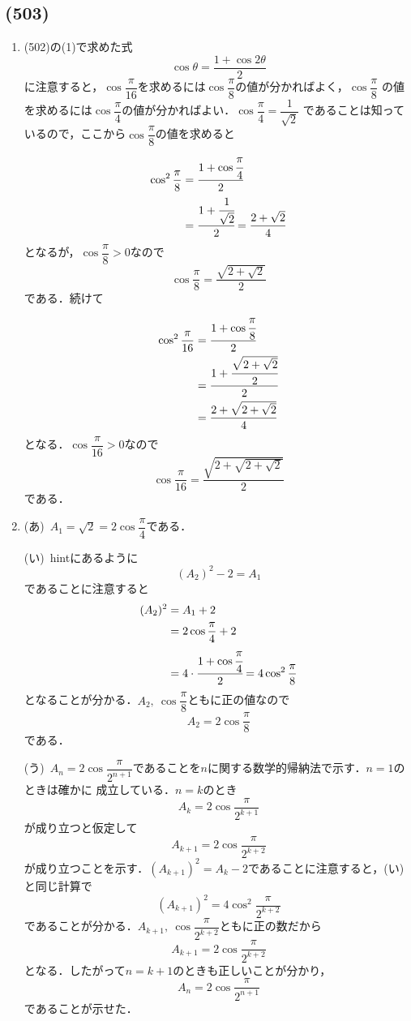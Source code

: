 \documentclass[dvipdfmx,twocolumn,uplatex]{jsarticle}
\theoremstyle{definition}
\begin{document}
    \subsection*{(503)}
    \begin{enumerate}[label=(\arabic*)]
        \item (502)の(1)で求めた式
        \[ \cos\theta=\frac{1+\cos 2\theta}{2} \]
        に注意すると，$\cos\dfrac{\pi}{16}$を求めるには$\cos\dfrac{\pi}{8}$の値が分かればよく，$\cos\dfrac{\pi}{8}$
        の値を求めるには$\cos\dfrac{\pi}{4}$の値が分かればよい．$\cos\dfrac{\pi}{4}=\dfrac{1}{\sqrt{2}}$
        であることは知っているので，ここから$\cos\dfrac{\pi}{8}$の値を求めると
        \begin{align*}
        \cos^2\frac{\pi}{8}&=\cfrac{1+\cos\cfrac{\pi}{4}}{2} \\
        &=\cfrac{1+\cfrac{1}{\sqrt{2}}}{2}=\frac{2+\sqrt{2}}{4}
        \end{align*}
        となるが，$\cos\dfrac{\pi}{8}>0$なので
        \[\cos\frac{\pi}{8} =\frac{\sqrt{2+\sqrt{2}}}{2}\]
        である．続けて
        \begin{align*}
            \cos^2\frac{\pi}{16} &= \cfrac{1+\cos\cfrac{\pi}{8}}{2} \\
            &=\cfrac{1+\cfrac{\sqrt{2+\sqrt{2}}}{2}}{2} \\
            &=\frac{2+\sqrt{2+\sqrt{2}}}{4}
        \end{align*}
        となる．$\cos\dfrac{\pi}{16}>0$なので
        \[ \boxed{\cos\frac{\pi}{16}=\frac{\sqrt{2+\sqrt{2+\sqrt{2}}}}{2}} \]
        である．
        
        \item 
        (あ)\ $A_1=\sqrt{2}=\boxed{2\cos\dfrac{\pi}{4}}$である．
        
        (い)\ hintにあるように
            \[ (A_2)^2-2= A_1 \]
            であることに注意すると
            \begin{align*}
                (A_2)^2&=A_1+2\\
                &=2\cos\frac{\pi}{4}+2\\
                &=4\cdot \cfrac{1+\cos\cfrac{\pi}{4}}{2}=4\cos^2\frac{\pi}{8}
            \end{align*}
            となることが分かる．$A_2,\ \cos\dfrac{\pi}{8}$ともに正の値なので
            \[ \boxed{A_2=2\cos\frac{\pi}{8}} \]
            である．
        
        (う)\ $A_n=2\cos\dfrac{\pi}{2^{n+1}}$であることを$n$に関する数学的帰納法で示す．$n=1$のときは確かに
        成立している．$n=k$のとき
        \[A_k=2\cos\frac{\pi}{2^{k+1}} \]
        が成り立つと仮定して
        \[A_{k+1}=2\cos\frac{\pi}{2^{k+2}} \]
        が成り立つことを示す．$(A_{k+1})^2=A_k-2$であることに注意すると，(い)と同じ計算で
        \[ (A_{k+1})^2 = 4\cos^2\frac{\pi}{2^{k+2}} \]
        であることが分かる．$A_{k+1},\ \cos\dfrac{\pi}{2^{k+2}}$ともに正の数だから
        \[A_{k+1}=2\cos\frac{\pi}{2^{k+2}} \]
        となる．したがって$n=k+1$のときも正しいことが分かり，
        \[\boxed{A_n=2\cos\frac{\pi}{2^{n+1}}} \]
        であることが示せた．
    \end{enumerate}
    
\end{document}
